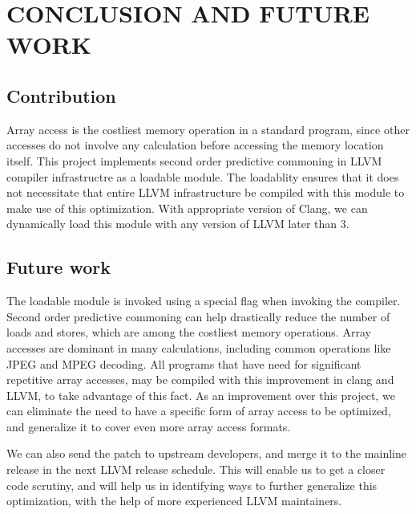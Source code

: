 
\chapter{CONCLUSION AND FUTURE WORK} %
\section{Contribution}

Array access is the costliest memory operation in a standard program, since other accesses do not involve any calculation before accessing the memory location itself. This project implements second order predictive commoning in LLVM compiler infrastructre as a loadable module. The loadablity ensures that it does not necessitate that entire LLVM infrastructure be compiled with this module to make use of this optimization. With appropriate version of Clang, we can dynamically load this module with any version of LLVM later than 3.
\section{Future work}
The loadable module is invoked using a special flag when invoking the compiler. Second order predictive commoning can help drastically reduce the number of loads and stores, which are among the costliest memory operations. Array accesses are dominant in many calculations, including common operations like JPEG and MPEG decoding. All programs that have need for significant repetitive array accesses, may be compiled with this improvement in clang and LLVM, to take advantage of this fact. As an improvement over this project, we can eliminate the need to have a specific form of array access to be optimized, and generalize it to cover even more array access formats. 

We can also send the patch to upstream developers, and merge it to the mainline release in the next LLVM release schedule. This will enable us to get a closer code scrutiny, and will help us in identifying ways to further generalize this optimization, with the help of more experienced LLVM maintainers. 